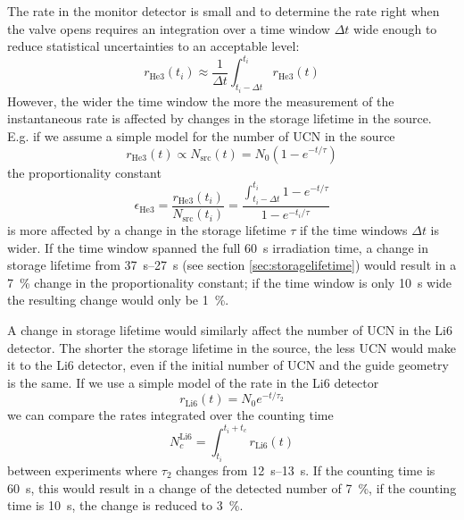 \documentclass[10pt,letterpaper]{article}
\begin{document}
The rate in the monitor detector is small and to determine the rate right when the valve opens requires an integration over a time window $\Delta t$ wide enough to reduce statistical uncertainties to an acceptable level:
\begin{equation}
\label{eq:normalization_irradiation_end}
r_\mathrm{He3}(t_i) \approx \frac{1}{\Delta t} \int_{t_i - \Delta t}^{t_i}  r_\mathrm{He3}(t)
\end{equation}
However, the wider the time window the more the measurement of the instantaneous rate is affected by changes in the storage lifetime in the source. E.g. if we assume a simple model for the number of UCN in the source
\begin{equation}
r_\mathrm{He3}(t) \propto N_\mathrm{src}(t) = N_0 \left( 1 - e^{-t/\tau} \right)
\end{equation}
the proportionality constant
\begin{equation}
\epsilon_\mathrm{He3} = \frac{r_\mathrm{He3}(t_i)}{N_\mathrm{src}(t_i)} = \frac{\int_{t_i - \Delta t}^{t_i} 1 - e^{-t/\tau}}{1 - e^{-t_i/\tau}}
\end{equation}
is more affected by a change in the storage lifetime $\tau$ if the time windows $\Delta t$ is wider. If the time window spanned the full \SI{60}{\second} irradiation time, a change in storage lifetime from \SIrange{37}{27}{\second} (see section \ref{sec:storagelifetime}) would result in a \SI{7}{\percent} change in the proportionality constant; if the time window is only \SI{10}{\second} wide the resulting change would only be \SI{1}{\percent}.

A change in storage lifetime would similarly affect the number of UCN in the Li6 detector. The shorter the storage lifetime in the source, the less UCN would make it to the Li6 detector, even if the initial number of UCN and the guide geometry is the same. If we use a simple model of the rate in the Li6 detector
\begin{equation}
r_\mathrm{Li6}(t) = N_0 e^{-t/\tau_2}
\end{equation}
we can compare the rates integrated over the counting time
\begin{equation}
N^\mathrm{Li6}_c = \int_{t_i}^{t_i+t_c} r_\mathrm{Li6}(t)
\end{equation}
between experiments where $\tau_2$ changes from \SIrange{12}{13}{\second}. If the counting time is \SI{60}{\second}, this would result in a change of the detected number of \SI{7}{\percent}, if the counting time is \SI{10}{\second}, the change is reduced to \SI{3}{\percent}.
\end{document}
